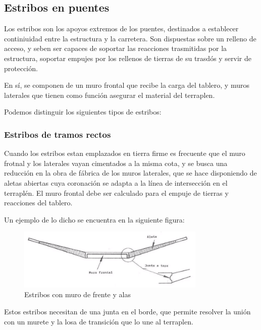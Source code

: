 \documentclass[../main.tex]{subfiles}
\begin{document}
\subsection{Estribos en puentes}

Los estribos son los apoyos extremos de los puentes, destinados a establecer
continiuidad entre la estructura y la carretera. Son dispuestas sobre un
relleno de acceso, y seben ser capaces de soportar las reacciones trasmitidas
por la estructura, soportar empujes por los rellenos de tierras de su trasdós
y servir de protección.

En sí, se componen de un muro frontal que recibe la carga del tablero, y muros
laterales que tienen como función asegurar el material del terraplen.

Podemos distinguir los siguientes tipos de estribos:


\subsubsection{Estribos de tramos rectos}

Cuando los estribos estan emplazados en 
tierra firme es frecuente que el muro frotnal y los laterales vayan cimentados
a la misma cota, y se busca una reducción en la obra de fábrica de los muros 
laterales, que se hace disponiendo de aletas abiertas cuya coronación se 
adapta a la línea de intersección en el terraplén.
El muro frontal debe ser calculado para el empuje de tierras y reacciones del
tablero.

Un ejemplo de lo dicho se encuentra en la siguiente figura:

\begin{figure}[ht]
  \centering
  \includegraphics[width=0.8\textwidth]{../images/20210426/estribo_recto}
  \caption{Estribos con muro de frente y alas}
  \label{fig:estribo_recto}
\end{figure}

Estos estribos necesitan de una junta en el borde, que permite resolver la 
unión con un murete y la losa de transición que lo une al terraplen.

\end{document}
